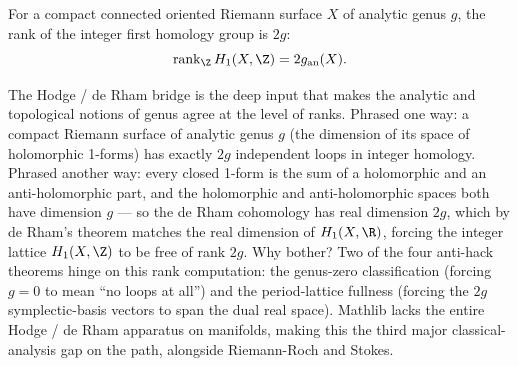 \begin{theorem}
\label{input:hodge-deRham}
For a compact connected oriented Riemann surface \(X\) of analytic
genus \(g\), the rank of the integer first homology group is
\(2g\):
\[
  \mathrm{rank}_{\Z}\,H_1(X,\Z) = 2 g_{\mathrm{an}}(X).
\]
\notready
\end{theorem}

\begin{layman}
The Hodge / de Rham bridge is the deep input that makes the
analytic and topological notions of genus agree at the level of
ranks. Phrased one way: a compact Riemann surface of analytic
genus \(g\) (the dimension of its space of holomorphic 1-forms) has
exactly \(2g\) independent loops in integer homology. Phrased
another way: every closed 1-form is the sum of a holomorphic and
an anti-holomorphic part, and the holomorphic and anti-holomorphic
spaces both have dimension \(g\) — so the de Rham cohomology has
real dimension \(2g\), which by de Rham's theorem matches the
real dimension of \(H_1(X,\R)\), forcing the integer lattice
\(H_1(X,\Z)\) to be free of rank \(2g\). Why bother? Two of the
four anti-hack theorems hinge on this rank computation: the
genus-zero classification (forcing \(g=0\) to mean ``no loops at
all'') and the period-lattice fullness (forcing the
\(2g\) symplectic-basis vectors to span the dual real space).
Mathlib lacks the entire Hodge / de Rham apparatus on manifolds,
making this the third major classical-analysis gap on the path,
alongside Riemann-Roch and Stokes.
\end{layman}

